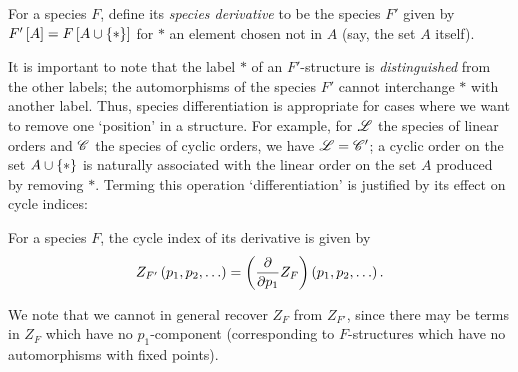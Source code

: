 \documentclass[sectionflow,singlespace,twoside,boldmathhdr]{brandiss} %
\numberwithin{section}{chapter}
\numberwithin{figure}{chapter}
\begin{document}
\begin{definition}
  \label{def:specderiv}
  For a species $F$, define its \emph{species derivative} to be the species $F'$ given by $F' \left[ {A} \right] = F \left[ {A \cup \left\{ {*} \right\}} \right]$ for $*$ an element chosen not in $A$ (say, the set $A$ itself).
\end{definition}
It is important to note that the label $*$ of an $F'$-structure is \emph{distinguished} from the other labels; the automorphisms of the species $F'$ cannot interchange $*$ with another label.
Thus, species differentiation is appropriate for cases where we want to remove one `position' in a structure.
For example, for $\mathscr{L}$ the species of linear orders and $\mathscr{C}$ the species of cyclic orders, we have $\mathscr{L} = \mathscr{C}'$; a cyclic order on the set $A \cup \left\{ {*} \right\}$ is naturally associated with the linear order on the set $A$ produced by removing $*$.
Terming this operation `differentiation' is justified by its effect on cycle indices:
\begin{theorem}
  \label{thm:specderivci}
  For a species $F$, the cycle index of its derivative is given by
  \begin{equation}
    \label{eq:specderivci}
    Z_{F'} \left( {p_{1}, p_{2}, \dots} \right) = \left( {\frac{\partial}{\partial p_{1}} Z_{F}} \right) \left( {p_{1}, p_{2}, \dots} \right).
  \end{equation}
\end{theorem}
We note that we cannot in general recover $Z_{F}$ from $Z_{F'}$, since there may be terms in $Z_{F}$ which have no $p_{1}$-component (corresponding to $F$-structures which have no automorphisms with fixed points).
\end{document}
